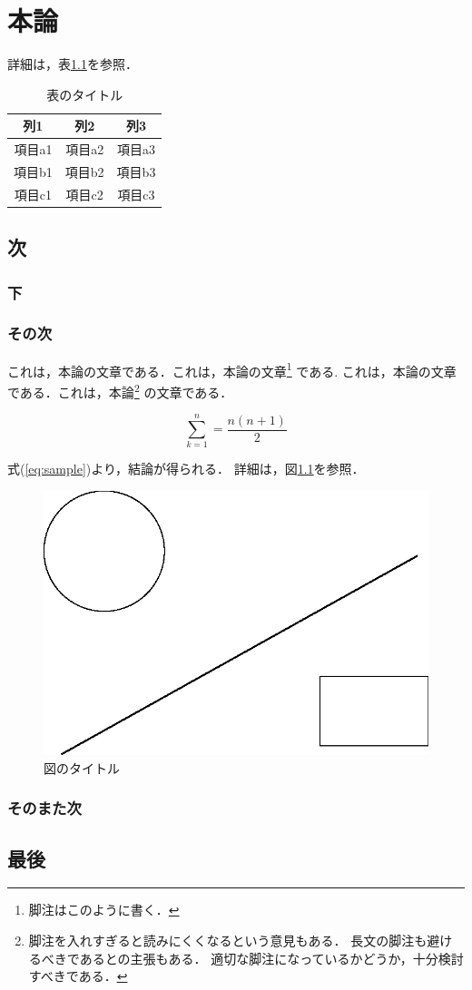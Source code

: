 \chapter{本論}

詳細は，表\ref{table:sample}を参照．

\begin{table}[btp]
 \caption{\label{table:sample}表のタイトル}
 \begin{center}
  \begin{tabular}{ccc}
   \hline
   列1 & 列2 & 列3 \\
   \hline
   項目a1 & 項目a2 & 項目a3 \\
   項目b1 & 項目b2 & 項目b3 \\
   項目c1 & 項目c2 & 項目c3 \\
   \hline
  \end{tabular} 
 \end{center}
\end{table}

\section{次}

\subsection{下}


\subsection{その次}


これは，本論の文章である．これは，本論の文章\footnote{脚注はこのように書く．}
である. 
これは，本論の文章である．これは，本論\footnote{
脚注を入れすぎると読みにくくなるという意見もある．
長文の脚注も避けるべきであるとの主張もある．
適切な脚注になっているかどうか，十分検討すべきである．}
の文章である．

\begin{equation}\label{eq:sample}
 \sum_{k = 1}^{n} = \frac{n(n+1)}{2}
\end{equation}

式(\ref{eq:sample})より，結論が得られる．
詳細は，図\ref{figure:sample}を参照．

\begin{figure}[!h]
 \begin{center}
  \includegraphics[width=0.5\columnwidth]{figures/fig.eps}
 \end{center}
 \caption{\label{figure:sample}図のタイトル}
\end{figure}

\subsection{そのまた次}

\section{最後}



